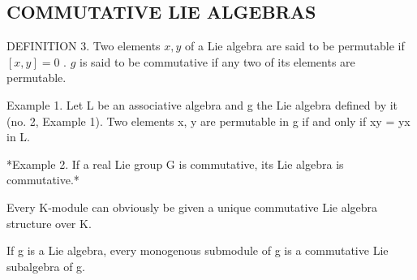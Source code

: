 \subsection{COMMUTATIVE LIE ALGEBRAS}

DEFINITION 3. Two elements \(x, y\) of a Lie algebra are said to be permutable if \([x, y] = 0\) . \(g\) is said to be commutative if any two of its elements are permutable.

Example 1. Let L be an associative algebra and g the Lie algebra defined by it (no. 2, Example 1). Two elements x, y are permutable in g if and only if xy = yx in L.

*Example 2. If a real Lie group G is commutative, its Lie algebra is commutative.*

Every K-module can obviously be given a unique commutative Lie algebra structure over K.

If g is a Lie algebra, every monogenous submodule of g is a commutative Lie subalgebra of g.

